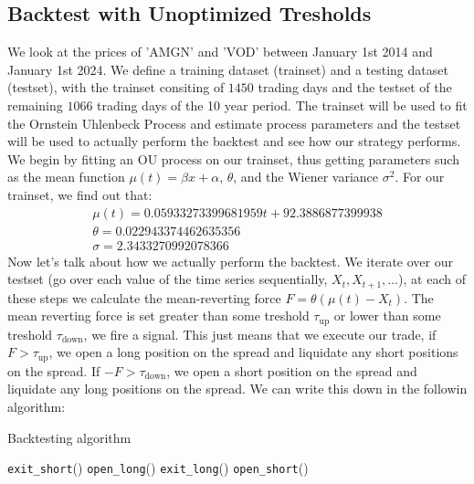 \documentclass{article}
\begin{document}
\begin{spacing}{2.0}
\subsection{Backtest with Unoptimized Tresholds}

We look at the prices of 'AMGN' and 'VOD' between January 1st 2014 and January 1st 2024. We define a training dataset (trainset) and a testing dataset (testset), with the trainset consiting
of $1450$ trading days and the testset of the remaining $1066$ trading days of the 10 year period. The trainset will be used to fit the Ornstein Uhlenbeck Process and estimate process
parameters and the testset will be used to actually perform the backtest and see how our strategy performs. We begin by fitting an OU process on our trainset, thus getting parameters such
as the mean function $\mu(t) = \beta x + \alpha$, $\theta$, and the Wiener variance $\sigma^{2}$. For our trainset, we find out that:
\begin{gather*}
    \mu(t) = 0.05933273399681959t + 92.3886877399938 \\
    \theta = 0.022943374462635356 \\
    \sigma = 2.3433270992078366
\end{gather*}
Now let's talk about how we actually perform the backtest. We iterate over our testset (go over each value of the time series sequentially, $X_{t}, X_{t + 1}, \dots$), at each of these steps
we calculate the mean-reverting force $F = \theta(\mu(t) - X_{t})$. The mean reverting force is set greater than some treshold $\tau_{\text{up}}$ or lower than some treshold $\tau_{\text{down}}$,
we fire a signal. This just means that we execute our trade, if $F > \tau_{\text{up}}$, we open a long position on the spread and liquidate any short positions on the spread. If
$-F > \tau_{\text{down}}$, we open a short position on the spread and liquidate any long positions on the spread. We can write this down in the followin algorithm:

\begin{algorithm}
    \caption{Backtesting algorithm}
    \begin{algorithmic}
                \State \texttt{exit\_short}()
                \State \texttt{open\_long}()
                \State \texttt{exit\_long}()
                \State \texttt{open\_short}()
            \EndIf
        \EndFor
    \end{algorithmic}
\end{algorithm}


\end{spacing}
\end{document}
